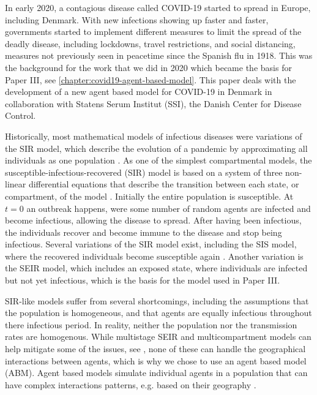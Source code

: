 In early 2020, a contagious disease called COVID-19 started to spread in Europe, including Denmark. With new infections showing up faster and faster, governments started to implement different measures to limit the spread of the deadly disease, including lockdowns, travel restrictions, and social distancing, measures not previously seen in peacetime since the Spanish flu in 1918. This was the background for the work that we did in 2020 which became the basis for Paper III, see \autoref{chapter:covid19-agent-based-model}. This paper deals with the development of a new agent based model for COVID-19 in Denmark in collaboration with Statens Serum Institut (SSI), the Danish Center for Disease Control.

Historically, most mathematical models of infectious diseases were variations of the SIR model, which describe the evolution of a pandemic by approximating all individuals as one population \autocite{kermackContributionMathematicalTheory1927}.
As one of the simplest compartmental models, the susceptible-infectious-recovered (SIR) model is based on a system of three non-linear differential equations that describe the transition between each state, or compartment, of the model \autocite{krogerAnalyticalSolutionSIRmodel2020}.
Initially the entire population is susceptible. At $t=0$ an outbreak happens, were some number of random agents are infected and become infectious, allowing the disease to spread. After having been infectious, the individuals recover and become immune to the disease and stop being infectious. Several variations of the SIR model exist, including the SIS model, where the recovered individuals become susceptible again \autocite{hethcoteThreeBasicEpidemiological1989}. Another variation is the SEIR model, which includes an exposed state, where individuals are infected but not yet infectious, which is the basis for the model used in Paper III.

SIR-like models suffer from several shortcomings, including the assumptions that the population is homogeneous, and that agents are equally infectious throughout there infectious period. In reality, neither the population nor the transmission rates are homogenous. While multistage SEIR and multicompartment models can help mitigate some of the issues, see \autocite{wuMultistageTimeDelayControl2022,tangReviewMultiCompartmentInfectious2020}, none of these can handle the geographical interactions between agents, which is why we chose to use an agent based model (ABM). Agent based models simulate individual agents in a population that can have complex interactions patterns, e.g. based on their geography \autocite{wilenskyIntroductionAgentBasedModeling2015}.

